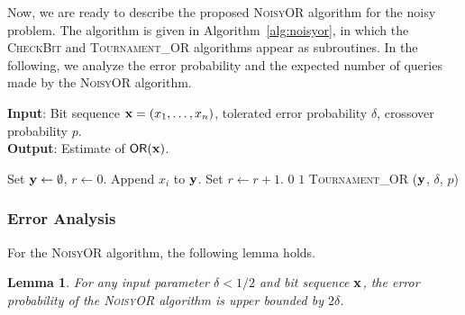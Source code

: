\documentclass[journal, onecolumn]{IEEEtran}
\theoremstyle{plain}
\newtheorem{lemma}[theorem]{Lemma}
\theoremstyle{definition}
\theoremstyle{remark}
\newcommand{\sno}{\textsc{NoisyOR }}
\newcommand{\scb}{\textsc{CheckBit }}
\newcommand{\stouror}{\textsc{Tournament\_OR }}
\begin{document}
Now, we are ready to describe the proposed \sno algorithm for the noisy \orn problem. The algorithm is given in Algorithm~\ref{alg:noisyor}, in which the \scb and \stouror algorithms appear as subroutines. In the following, we analyze the error probability and the expected number of queries made by the \sno algorithm.

\begin{algorithm}[t]%
    \caption{Proposed \sno algorithm}
    \label{alg:noisyor}
    \textbf{Input}: Bit sequence ${\bf x} = (x_1,\ldots,x_n)$, tolerated error probability $\delta$, crossover probability $p$.\\
    \textbf{Output}: Estimate of $\mathsf{OR}({\bf x})$.
    \begin{algorithmic}[1]
        \State Set ${\bf y} \gets \emptyset$, $r \gets 0$.
            \If{\scb($x_i$, $\delta$, $p)=1$}
                \State Append $x_i$ to ${\bf y}$.
                \State Set $r \gets r + 1$.
            \EndIf
        \EndFor
            \State \Return $0$
            \State \Return $1$
        \Else
            \State \Return \stouror(${\bf y}$, $\delta$, $p$)
        \EndIf
    \end{algorithmic}
\end{algorithm}

\vspace{0.5em}
\subsubsection{Error Analysis}
For the \sno algorithm, the following lemma holds.
\begin{lemma} \label{lemma:sno_error}
    For any input parameter $\delta < 1/2$ and bit sequence ${\bf x}$, the error probability of the \sno algorithm is upper bounded by $2\delta$.
\end{lemma}
\end{document}

